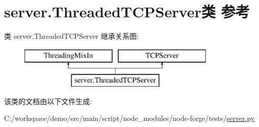 \hypertarget{classserver_1_1_threaded_t_c_p_server}{}\section{server.\+Threaded\+T\+C\+P\+Server类 参考}
\label{classserver_1_1_threaded_t_c_p_server}
类 server.\+Threaded\+T\+C\+P\+Server 继承关系图\+:\begin{figure}[H]
\begin{center}
\leavevmode
\includegraphics[height=2.000000cm]{classserver_1_1_threaded_t_c_p_server}
\end{center}
\end{figure}


该类的文档由以下文件生成\+:\begin{DoxyCompactItemize}
\item 
C\+:/workspace/demo/src/main/script/node\+\_\+modules/node-\/forge/tests/\mbox{\hyperlink{server_8py}{server.\+py}}\end{DoxyCompactItemize}
